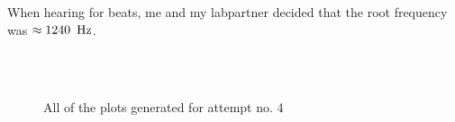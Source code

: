\documentclass[%
 reprint,
 amsmath,amssymb,
 aps,
]{revtex4-1}
\begin{document}
    When hearing for beats, me and my labpartner decided that the root frequency was $\approx 1240\enspace\textup{Hz}$.
    \newline
    \begin{figure}[h!]
      \centering
       \\
       \\
      \caption{All of the plots generated for attempt no. 4}
      \label{fig:sound_exp1}
    \end{figure}
\end{document}
